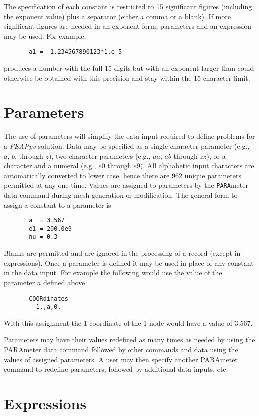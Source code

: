 The specification of each constant is restricted to 15
significant figures (including the exponent value) plus a separator (either
a comma or a blank).  If more
significant figures are needed in an exponent form, parameters and
an expression may be used.  For example,
\begin{verbatim}
       a1 =  1.234567890123*1.e-5
\end{verbatim}
produces a number with the full 15 digits but with an exponent larger than
could otherwise be obtained with this precision and stay within the
15 character limit.

\section{Parameters}

The use of parameters will simplify the data input
required to define problems for a {\sl FEAPpv} solution.
Data may be specified as a single character parameter
(e.g., $a$, $b$, through $z$), two character parameters
(e.g., $aa$, $ab$ through $zz$), or a character and a numeral
(e.g., $e0$ through $e9$).  All alphabetic input
characters are automatically converted to lower case, hence there are 962
unique parameters permitted at any one time.  Values are
assigned to parameters by the {\tt PARA}meter data command during mesh
generation or modification.  The general form to assign a constant
to a parameter is
\begin{verbatim}
       a  = 3.567
       e1 = 200.0e9
       nu = 0.3
\end{verbatim}
Blanks are permitted and are ignored in the processing of a
record (except in expressions).
Once a parameter is defined it may be used in place of
any constant in the data input.  For example the following would use
the value of the parameter $a$ defined above
\begin{verbatim}
       COORdinates
         1,,a,0.
\end{verbatim}
With this assignment the 1-coordinate of the 1-node would have a
value of 3.567.

Parameters may have their values redefined as many times as
needed by using the PARAmeter data command followed by other commands
and data using the values of assigned parameters.  A user may then
specify another
PARAmeter command to redefine parameters, followed by additional
data inputs, etc.

\section{Expressions}

